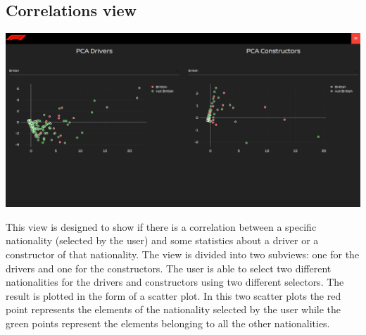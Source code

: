 \documentclass[11pt,twocolumn,letterpaper]{article}
\begin{document}
\subsection{Correlations view}
\begin{center}
	\centering
	\includegraphics[width=\columnwidth]{correlations}
\end{center}
This view is designed to show if there is a correlation between a specific nationality (selected by the user) and some statistics about a driver or a 
constructor of that nationality. The view is divided into two subviews: one for the drivers and one for the constructors. The user is able to select two different nationalities
for the drivers and constructors using two different selectors. The result is plotted in the form of a scatter plot. In this two scatter plots the red point represents the elements
of the nationality selected by the user while the green points represent the elements belonging to all the other nationalities.
\end{document}
